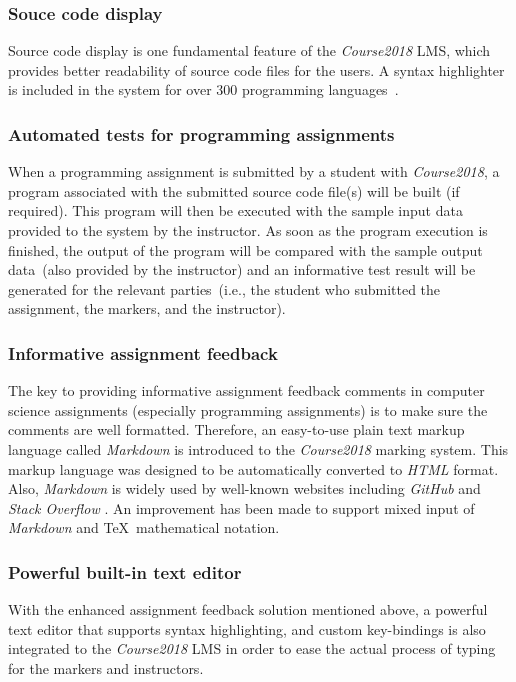 \subsubsection{Souce code display}
Source code display is one fundamental feature of the \emph{Course2018} LMS,
which provides better readability of source code files for the users.
A syntax highlighter is included in the system for over 300 programming
languages~\cite{ApygmentsLangs}.

\subsubsection{Automated tests for programming assignments}
When a programming assignment is submitted by a student with \emph{Course2018},
a program associated with the submitted source code file(s) will be built
(if required).
This program
will then be executed with the sample input data provided to the system
by the instructor.
As soon as the program execution is finished, 
the output of the program will be compared with the sample output data~(also
provided by the instructor) and
an informative test result will be generated for the relevant parties~(i.e.,
the student who submitted the assignment, the markers, and the
instructor).

\subsubsection{Informative assignment feedback}
The key to providing informative assignment feedback comments in computer
science assignments (especially programming assignments) is to make sure the
comments are well formatted.
Therefore, an easy-to-use plain text markup language called \emph{Markdown}
is introduced to the \emph{Course2018} marking system. This markup language was
designed to be automatically converted to \emph{HTML} format.
Also, \emph{Markdown} is
widely used by well-known websites including \emph{GitHub} \cite{CgitHubMarkDown}
and \emph{Stack Overflow} \cite{stackOverflowMarkdown}.
An improvement has been made to support mixed
input of \emph{Markdown} and \TeX\ mathematical notation.

\subsubsection{Powerful built-in text editor}
With the enhanced assignment feedback solution mentioned above, a powerful
text editor that supports syntax highlighting, and custom key-bindings is also
integrated to the \emph{Course2018} LMS in order to ease the actual process of
typing for the markers and instructors.